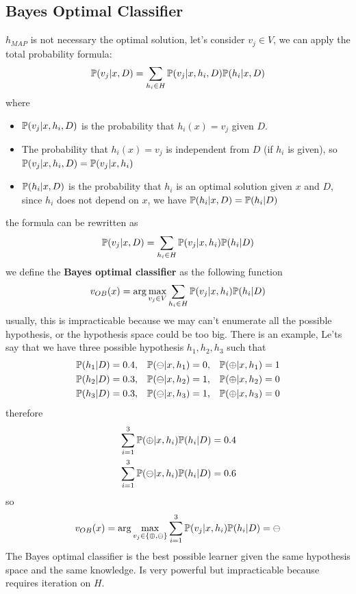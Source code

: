 \documentclass[10pt, letterpaper]{report}
\begin{document}
\subsection{Bayes Optimal Classifier}
$h_{MAP}$ is not necessary the optimal solution, let's consider $v_j\in V$, we can apply the total probability formula:\begin{equation}
    {\mathbb P}(v_j|x,D)=\sum_{h_i\in H}{\mathbb P}(v_j|x,h_i,D){\mathbb P}(h_i|x,D)
\end{equation}
where \begin{itemize}
    \item ${\mathbb P}(v_j|x,h_i,D)$ is the probability that $h_i(x)=v_j$ given $D$.
    \item The probability that  $h_i(x)=v_j$ is independent from $D$ (if $h_i$ is given), so ${\mathbb P}(v_j|x,h_i,D)={\mathbb P}(v_j|x,h_i)$
    \item ${\mathbb P}(h_i|x,D)$ is the probability that $h_i$ is an optimal solution given $x$ and $D$, since $h_i$ does not depend on $x$, we have ${\mathbb P}(h_i|x,D)={\mathbb P}(h_i|D)$ 
\end{itemize}
the formula can be rewritten as\begin{equation}
    {\mathbb P}(v_j|x,D)=\sum_{h_i\in H}{\mathbb P}(v_j|x,h_i){\mathbb P}(h_i|D)
\end{equation}
we define the \textbf{Bayes optimal classifier} as the following function\begin{equation}
    v_{OB}(x)=\arg\max_{v_j\in V}\sum_{h_i\in H}{\mathbb P}(v_j|x,h_i){\mathbb P}(h_i|D)
\end{equation}
usually, this is impracticable because we may can't enumerate all the possible hypothesis, or the hypothesis space could be too big. There is an example, Le'ts say that we have three possible hypothesis $h_1,h_2,h_3$ such that
\begin{align*}
{\mathbb P}(h_1|D) &= 0.4, & {\mathbb P}(\ominus|x, h_1) &= 0, & {\mathbb P}(\oplus|x, h_1) &= 1 \\
{\mathbb P}(h_2|D) &= 0.3, & {\mathbb P}(\ominus|x, h_2) &= 1, & {\mathbb P}(\oplus|x, h_2) &= 0 \\
{\mathbb P}(h_3|D) &= 0.3, & {\mathbb P}(\ominus|x, h_3) &= 1, & {\mathbb P}(\oplus|x, h_3) &= 0
\end{align*}
therefore\begin{align*}
    &\sum_{i=1}^3{\mathbb P}(\oplus|x,h_i){\mathbb P}(h_i|D)=0.4\\
    &\sum_{i=1}^3{\mathbb P}(\ominus|x,h_i){\mathbb P}(h_i|D)=0.6
\end{align*}
so\begin{equation}
    v_{OB}(x)=\arg\max_{v_j\in\{\oplus,\ominus\}}\sum_{i=1}^3{\mathbb P}(v_j|x,h_i){\mathbb P}(h_i|D)=\ominus
\end{equation}
The Bayes optimal classifier is the best possible learner given the same hypothesis space and the same knowledge. Is very powerful but impracticable because requires iteration on $H$.\bigskip
\end{document}
